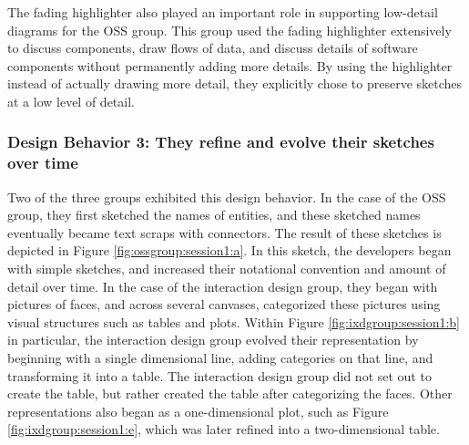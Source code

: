 \documentclass[12pt,fleqn]{ucithesis}
\begin{document}
The fading highlighter also played an important role in supporting low-detail diagrams for the OSS group. This group used the fading highlighter extensively to discuss components, draw flows of data, and discuss details of software components without permanently adding more details. By using the highlighter instead of actually drawing more detail, they explicitly chose to preserve sketches at a low level of detail.

%
%
%
%
%
%
%
%

\subsubsection{Design Behavior 3: They refine and evolve their sketches over time}

Two of the three groups exhibited this design behavior. In the case of the OSS group, they first sketched the names of entities, and these sketched names eventually became text scraps with connectors. The result of these sketches is depicted in Figure \ref{fig:ossgroup:session1:a}. In this sketch, the developers began with simple sketches, and increased their notational convention and amount of detail over time. In the case of the interaction design group, they began with pictures of faces, and across several canvases, categorized these pictures using visual structures such as tables and plots. Within Figure \ref{fig:ixdgroup:session1:b} in particular, the interaction design group evolved their representation by beginning with a single dimensional line, adding categories on that line, and transforming it into a table. The interaction design group did not set out to create the table, but rather created the table after categorizing the faces. Other representations also began as a one-dimensional plot, such as Figure \ref{fig:ixdgroup:session1:e}, which was later refined into a two-dimensional table.
\end{document}
